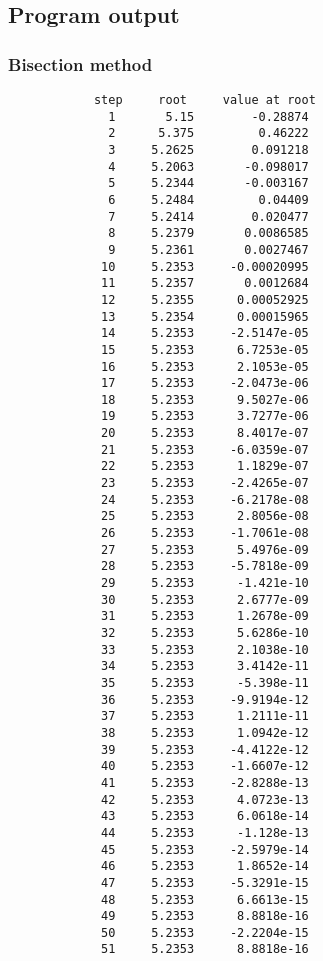 \documentclass{article}
\begin{document}
	\subsection{Program output}
	
	\subsubsection{Bisection method}
	
	\begin{multicols}{2}
		\begin{verbatim}
			step     root     value at root
			  1       5.15        -0.28874 
			  2      5.375         0.46222 
			  3     5.2625        0.091218 
			  4     5.2063       -0.098017 
			  5     5.2344       -0.003167 
			  6     5.2484         0.04409 
			  7     5.2414        0.020477 
			  8     5.2379       0.0086585 
			  9     5.2361       0.0027467 
			 10     5.2353     -0.00020995 
			 11     5.2357       0.0012684 
			 12     5.2355      0.00052925 
			 13     5.2354      0.00015965 
			 14     5.2353     -2.5147e-05 
			 15     5.2353      6.7253e-05 
			 16     5.2353      2.1053e-05 
			 17     5.2353     -2.0473e-06 
			 18     5.2353      9.5027e-06 
			 19     5.2353      3.7277e-06 
			 20     5.2353      8.4017e-07 
			 21     5.2353     -6.0359e-07 
			 22     5.2353      1.1829e-07 
			 23     5.2353     -2.4265e-07 
			 24     5.2353     -6.2178e-08 
			 25     5.2353      2.8056e-08 
			 26     5.2353     -1.7061e-08 
			 27     5.2353      5.4976e-09 
			 28     5.2353     -5.7818e-09 
			 29     5.2353      -1.421e-10 
			 30     5.2353      2.6777e-09 
			 31     5.2353      1.2678e-09 
			 32     5.2353      5.6286e-10 
			 33     5.2353      2.1038e-10 
			 34     5.2353      3.4142e-11 
			 35     5.2353      -5.398e-11 
			 36     5.2353     -9.9194e-12 
			 37     5.2353      1.2111e-11 
			 38     5.2353      1.0942e-12 
			 39     5.2353     -4.4122e-12 
			 40     5.2353     -1.6607e-12 
			 41     5.2353     -2.8288e-13 
			 42     5.2353      4.0723e-13 
			 43     5.2353      6.0618e-14 
			 44     5.2353      -1.128e-13 
			 45     5.2353     -2.5979e-14 
			 46     5.2353      1.8652e-14 
			 47     5.2353     -5.3291e-15 
			 48     5.2353      6.6613e-15 
			 49     5.2353      8.8818e-16 
			 50     5.2353     -2.2204e-15 
			 51     5.2353      8.8818e-16
		\end{verbatim}
	\end{multicols}
	
	\newpage
	
\end{document}
